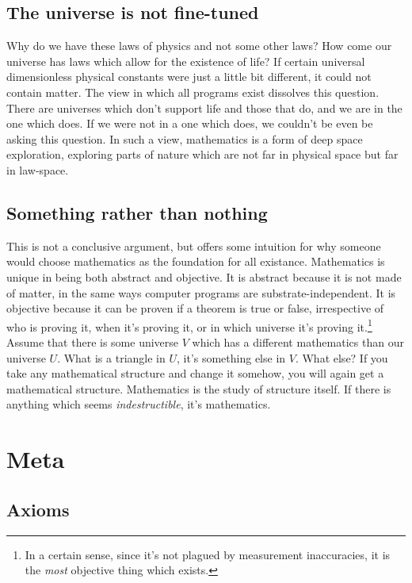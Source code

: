 \documentclass[oneside,hidelinks]{article}
\begin{document}
\newpage

\subsection{The universe is not fine-tuned}

Why do we have these laws of physics and not some other laws?
How come our universe has laws which allow for the existence of life?
If certain universal dimensionless physical constants were just a little bit different, it could not contain matter.
The view in which all programs exist dissolves this question.
There are universes which don't support life and those that do, and we are in the one which does.
If we were not in a one which does, we couldn't be even be asking this question.
In such a view, mathematics is a form of deep space exploration, exploring parts of nature which are not far in physical space but far in law-space.

\newpage

\subsection{Something rather than nothing}

This is not a conclusive argument, but offers some intuition for why someone would choose mathematics as the foundation for all existance.
Mathematics is unique in being both abstract and objective.
It is abstract because it is not made of matter, in the same ways computer programs are substrate-independent.
It is objective because it can be proven if a theorem is true or false, irrespective of who is proving it, when it's proving it, or in which universe it's proving it.\footnote{In a certain sense, since it's not plagued by measurement inaccuracies, it is the \textit{most} objective thing which exists.}
Assume that there is some universe $V$ which has a different mathematics than our universe $U$.
What is a triangle in $U$, it's something else in $V$.
What else?
If you take any mathematical structure and change it somehow, you will again get a mathematical structure.
Mathematics is the study of structure itself.
If there is anything which seems \textit{indestructible}, it's mathematics.

\newpage

\section{Meta}

\subsection{Axioms}
\end{document}
